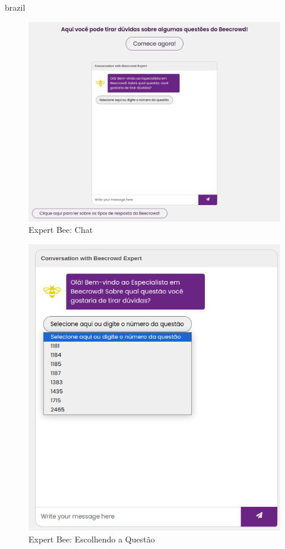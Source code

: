 \begin{otherlanguage*}{brazil}
\begin{figure}[H]
    \centering
            \caption{Expert Bee: Chat}
            \label{fig:ModeloConceitual}
        \includegraphics[scale=0.41]{pictures/desenvolvimento/expert_bee_chat.png}
\end{figure}

\begin{figure}[H]
    \centering
            \caption{Expert Bee: Escolhendo a Questão}
            \label{fig:ModeloConceitual}
        \includegraphics[scale=0.63]{pictures/desenvolvimento/expert_bee_escolha_de_questoes.png}
\end{figure}


\end{otherlanguage*}
